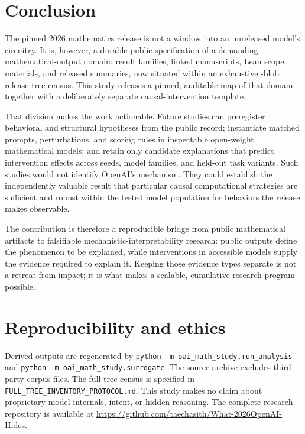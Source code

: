 \documentclass[11pt]{article}
\begin{document}
\section{Conclusion}

The pinned 2026 mathematics release is not a window into an unreleased model's
circuitry. It is, however, a durable public specification of a demanding
mathematical-output domain: \TotalFamilies{} result families,
\TotalManuscripts{} linked manuscripts, Lean scope materials, and
\TraceCount{} released summaries, now situated within an exhaustive
\TreeBlobs{}-blob release-tree census. This study releases a pinned, auditable
map of that domain together with a deliberately separate causal-intervention
template.

That division makes the work actionable. Future studies can preregister
behavioral and structural hypotheses from the public record; instantiate
matched prompts, perturbations, and scoring rules in inspectable open-weight
mathematical models; and retain only candidate explanations that predict
intervention effects across seeds, model families, and held-out task variants.
Such studies would not identify OpenAI's mechanism. They could establish the
independently valuable result that particular causal computational strategies
are sufficient and robust within the tested model population for behaviors the
release makes observable.

The contribution is therefore a reproducible bridge from public mathematical
artifacts to falsifiable mechanistic-interpretability research: public outputs
define the phenomenon to be explained, while interventions in accessible models
supply the evidence required to explain it. Keeping those evidence types
separate is not a retreat from impact; it is what makes a scalable, cumulative
research program possible.

\section*{Reproducibility and ethics}

Derived outputs are regenerated by
\texttt{python -m oai\_math\_study.run\_analysis} and
\texttt{python -m oai\_math\_study.surrogate}. The source archive excludes
third-party corpus files. The full-tree census is specified in
\texttt{FULL\_TREE\_INVENTORY\_PROTOCOL.md}. This study makes no claim about
proprietary model internals, intent, or hidden reasoning. The complete research
repository is available at \url{https://github.com/taechasith/What-2026OpenAI-Hides}.



\end{document}
